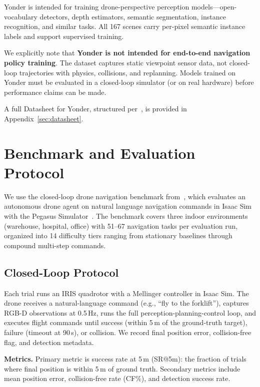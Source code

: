 \documentclass{article}
\begin{document}
Yonder is intended for training drone-perspective perception models---open-vocabulary detectors, depth estimators, semantic segmentation, instance recognition, and similar tasks. All 167 scenes carry per-pixel semantic instance labels and support supervised training.

We explicitly note that \textbf{Yonder is not intended for end-to-end navigation policy training}. The dataset captures static viewpoint sensor data, not closed-loop trajectories with physics, collisions, and replanning. Models trained on Yonder must be evaluated in a closed-loop simulator (or on real hardware) before performance claims can be made.

A full Datasheet for Yonder, structured per~\cite{gebru2021datasheets}, is provided in Appendix~\ref{sec:datasheet}.

\section{Benchmark and Evaluation Protocol}

We use the closed-loop drone navigation benchmark from~\cite{anon2026closing}, which evaluates an autonomous drone agent on natural language navigation commands in Isaac Sim with the Pegasus Simulator~\cite{jacinto2024pegasus}. The benchmark covers three indoor environments (warehouse, hospital, office) with 51--67 navigation tasks per evaluation run, organized into 14 difficulty tiers ranging from stationary baselines through compound multi-step commands.

\subsection{Closed-Loop Protocol}

Each trial runs an IRIS quadrotor with a Mellinger controller in Isaac Sim. The drone receives a natural-language command (e.g., ``fly to the forklift''), captures RGB-D observations at 0.5\,Hz, runs the full perception-planning-control loop, and executes flight commands until success (within 5\,m of the ground-truth target), failure (timeout at 90\,s), or collision. We record final position error, collision-free flag, and detection metadata.

\textbf{Metrics.} Primary metric is success rate at 5\,m (SR@5m): the fraction of trials where final position is within 5\,m of ground truth. Secondary metrics include mean position error, collision-free rate (CF\%), and detection success rate.
\end{document}
